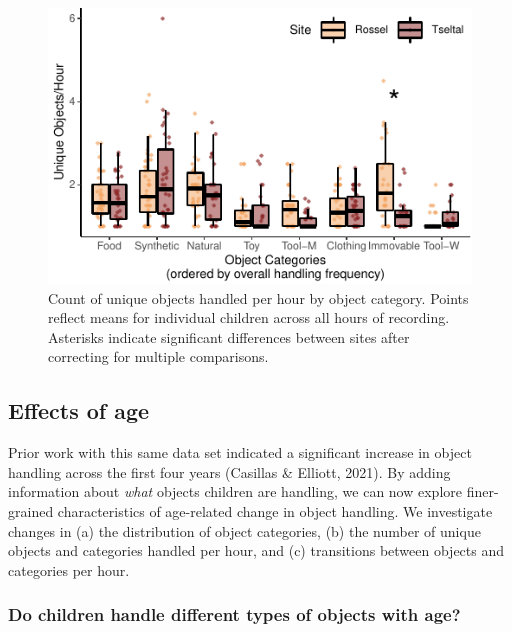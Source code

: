 \documentclass[10pt, letterpaper]{article}
\newenvironment{CodeChunk}{}{}
\begin{document}
\begin{CodeChunk}
\begin{figure}[!h]

\includegraphics{figs/overall-stats-fig-1} \hfill{}

\caption[Count of unique objects handled per hour by object category]{Count of unique objects handled per hour by object category. Points reflect means for individual children across all hours of recording. Asterisks indicate significant differences between sites after correcting for multiple comparisons.}\label{fig:overall-stats-fig}
\end{figure}
\end{CodeChunk}

\hypertarget{effects-of-age}{%
\subsection{Effects of age}\label{effects-of-age}}

Prior work with this same data set indicated a significant increase in
object handling across the first four years (Casillas \& Elliott, 2021).
By adding information about \emph{what} objects children are handling,
we can now explore finer-grained characteristics of age-related change
in object handling. We investigate changes in (a) the distribution of
object categories, (b) the number of unique objects and categories
handled per hour, and (c) transitions between objects and categories per
hour.

\hypertarget{do-children-handle-different-types-of-objects-with-age}{%
\subsubsection{Do children handle different types of objects with
age?}\label{do-children-handle-different-types-of-objects-with-age}}
\end{document}
